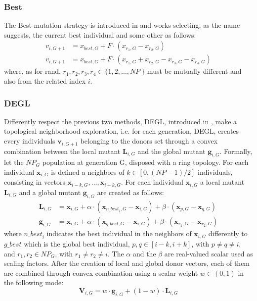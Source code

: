 \subsubsection{Best}
The Best mutation strategy is introduced in \cite{DESEHGOCS:1997} and works selecting, as the name suggests, the current best individual and some other as follows:
\begin{align}
	v_{i, G + 1} &= x_{\textit{best}, G} + F \cdot (x_{r_1, G} - x_{r_2, G}) \\
	v_{i, G + 1} &= x_{\textit{best}, G} + F \cdot (x_{r_1, G} + x_{r_2, G} - x_{r_3, G} - x_{r_4, G})
\end{align}
where, as for rand, $r_1, r_2, r_3, r_4 \in \{1, 2, \dots, \textit{NP}\ \}$ must be mutually different and also from the related index $i$.

\subsubsection{DEGL}
Differently respect the previous two methods, DEGL, introduced in \cite{DEGL:2009}, make a topological neighborhood exploration, i.e. for each generation, DEGL, creates every individuals $\textbf{v}_{i, G + 1}$ belonging to the donors set through a convex combination between the local mutant $\textbf{L}_{i, G}$ and the global mutant $\textbf{g}_{i, G}$.\newline\newline
Formally, let the $\textit{NP}_G$ population at generation G, disposed with a ring topology. For each individual $\textbf{x}_{i, G}$ is defined a neighbors of $k \in [0, (\textit{NP} - 1) / 2]$ individuals, consisting in vectors $\textbf{x}_{i - k, G}, \dots, \textbf{x}_{i + k, G}$. 
For each individual $\textbf{x}_{i, G}$ a local mutant $\textbf{L}_{i, G}$ and a global mutant $\textbf{g}_{i, G}$ are created as follows:
\begin{align}
	\textbf{L}_{i, G} &= \textbf{x}_{i, G} + \alpha \cdot (\textbf{x}_{\textit{n\_best}_i, G} - \textbf{x}_{i, G}) + \beta \cdot (\textbf{x}_{p, G} - \textbf{x}_{q, G}) \\
	\textbf{g}_{i, G} &= \textbf{x}_{i, G} + \alpha \cdot (\textbf{x}_{\textit{g\_best}, G} - \textbf{x}_{i, G}) + \beta \cdot (\textbf{x}_{r_1, G} - \textbf{x}_{r_2, G})
\end{align}
where $\textit{n\_best}_i$ indicates the best individual in the neighbors of $\textbf{x}_{i, G}$ differently to $\textit{g\_best}$ which is the global best individual, $p, q \in [i - k, i + k]$, with $p \neq q \neq i$, and $r_1, r_2 \in NP_{G}$, with $r_1 \neq r_2 \neq i$. The $\alpha$ and the $\beta$ are real-valued scalar used as scaling factors.\newline\newline
After the creation of local and global donor vectors, each of them are combined through convex combination using a scalar weight $w \in (0, 1)$ in the following mode:
\begin{equation}
	\textbf{V}_{i, G} = w \cdot \textbf{g}_{i, G} + (1 - w) \cdot \textbf{L}_{i, G}
\end{equation}

